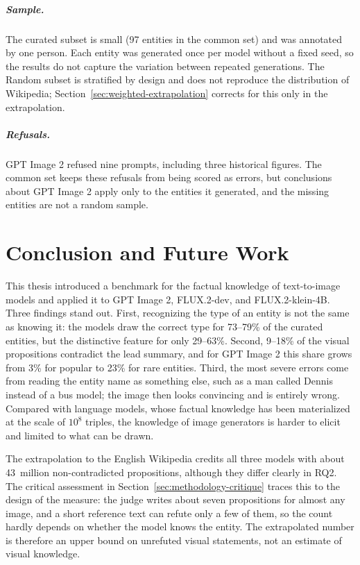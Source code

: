 \paragraph{Sample.} The curated subset is small (97 entities in the common set)
and was annotated by one person. Each entity was generated once per model
without a fixed seed, so the results do not capture the variation between
repeated generations. The Random subset is stratified by design and does not
reproduce the distribution of Wikipedia; Section~\ref{sec:weighted-extrapolation}
corrects for this only in the extrapolation.

\paragraph{Refusals.} GPT Image 2 refused nine prompts, including three
historical figures. The common set keeps these refusals from being scored as
errors, but conclusions about GPT Image 2 apply only to the entities it
generated, and the missing entities are not a random sample.

\chapter{Conclusion and Future Work}

This thesis introduced a benchmark for the factual knowledge of text-to-image
models and applied it to GPT Image 2, FLUX.2-dev, and FLUX.2-klein-4B. Three
findings stand out. First, recognizing the type of an entity is not the same as
knowing it: the models draw the correct type for 73--79\% of the curated
entities, but the distinctive feature for only 29--63\%. Second, 9--18\% of the
visual propositions contradict the lead summary, and for GPT Image 2 this share
grows from 3\% for popular to 23\% for rare entities. Third, the most severe
errors come from reading the entity name as something else, such as a man
called Dennis instead of a bus model; the image then looks convincing and is
entirely wrong. Compared with language models, whose factual knowledge has been
materialized at the scale of $10^8$ triples, the knowledge of image generators
is harder to elicit and limited to what can be drawn.

The extrapolation to the English Wikipedia credits all three models with about
43~million non-contradicted propositions, although they differ clearly in RQ2.
The critical assessment in Section~\ref{sec:methodology-critique} traces this to
the design of the measure: the judge writes about seven propositions for almost
any image, and a short reference text can refute only a few of them, so the count
hardly depends on whether the model knows the entity. The extrapolated number is
therefore an upper bound on unrefuted visual statements, not an estimate of
visual knowledge.

